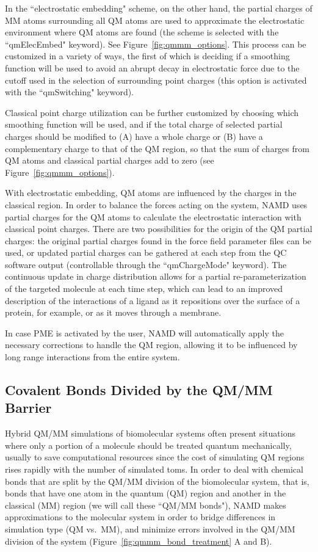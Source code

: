 In the ``electrostatic embedding" scheme, on the other hand, 
the partial charges of MM atoms surrounding all QM atoms 
are used to approximate the electrostatic environment where QM atoms 
are found (the scheme is selected with the ``qmElecEmbed" keyword). 
See Figure~\ref{fig:qmmm_options}.
This process can be customized in a variety 
of ways, the first of which is deciding if a smoothing function will 
be used to avoid an abrupt decay in electrostatic force 
due to the cutoff used in the selection of surrounding point charges
(this option is activated with the ``qmSwitching" keyword).

Classical point charge utilization can be further customized 
by choosing which smoothing function will be used, 
and if the total charge of selected partial charges should be 
modified to (A) have a whole charge or (B) have a complementary 
charge to that of the QM region, so that the sum of charges 
from QM atoms and classical partial charges add to zero
(see Figure~\ref{fig:qmmm_options}).

With electrostatic embedding, QM atoms are influenced by the charges 
in the classical region. In order to balance the forces acting on the 
system, NAMD uses partial charges for the QM atoms to calculate 
the electrostatic interaction with classical point charges. 
There are two possibilities for the origin of the QM partial charges: 
the original partial charges found in the force field parameter files 
can be used, or updated partial charges can be gathered at each step 
from the QC software output 
(controllable through the ``qmChargeMode" keyword). 
The continuous update in charge distribution allows for a partial 
re-parameterization of the targeted molecule at each time step, 
which can lead to an improved description of the interactions 
of a ligand as it repositions over the surface of a protein, 
for example, or as it moves through a membrane.

In case PME is activated by the user, NAMD will automatically apply 
the necessary corrections to handle the QM region, allowing it to be 
influenced by long range interactions from the entire system.


\subsection{Covalent Bonds Divided by the QM/MM Barrier}

Hybrid QM/MM simulations of biomolecular systems often present 
situations where only a portion of a molecule should be treated 
quantum mechanically, usually to save computational resources 
since the cost of simulating QM regions rises rapidly with the 
number of simulated toms. In order to deal with chemical bonds 
that are split by the QM/MM division of the biomolecular system, 
that is, bonds that have one atom in the quantum (QM) region and 
another in the classical (MM) region (we will call these ``QM/MM bonds"), 
NAMD makes approximations to the molecular system in order to bridge 
differences in simulation type (QM vs.\ MM), and minimize errors involved 
in the QM/MM division of the system
(Figure~\ref{fig:qmmm_bond_treatment} A and B).

